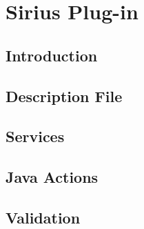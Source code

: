 \chapter{\label{sirius}Sirius Plug-in}
\section{\label{sirius:intro}Introduction}
\section{\label{sirius:desc}Description File}
\section{\label{sirius:services}Services}
\section{\label{sirius:java}Java Actions}
\section{\label{sirius:validation}Validation}
